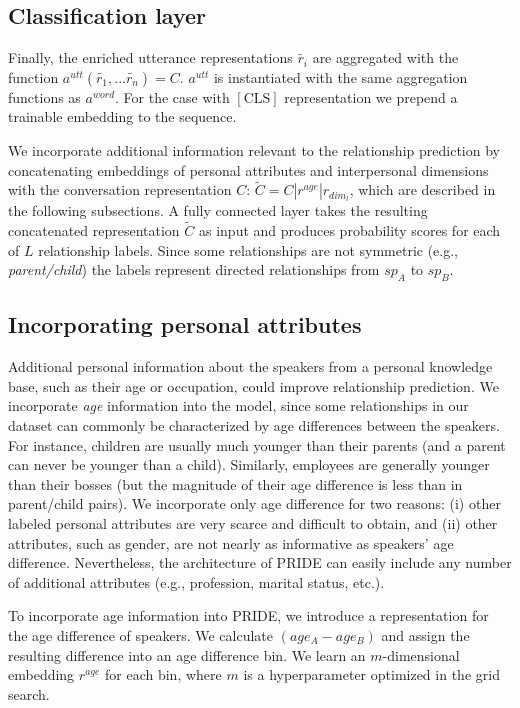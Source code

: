 \subsection{Classification layer}

Finally, the enriched utterance representations $\tilde{r_i}$ are aggregated with the function ${a^{utt}(\tilde{r_1},...\tilde{r_n})=C}$. 
$a^{utt}$ is instantiated with the same aggregation functions as $a^{word}$. For the case with $[\textrm{CLS}]$ representation we prepend a trainable embedding to the sequence.

We incorporate additional information relevant to the relationship prediction by concatenating embeddings of personal attributes and interpersonal dimensions with the conversation representation $C$: $\tilde{C} = C|r^{age}|r_{dim_l}$, which are described in the following subsections.
A fully connected layer takes the resulting concatenated representation $\tilde{C}$ as input and produces probability scores for each of $L$ relationship labels. Since some relationships are not symmetric (e.g., \emph{parent/child}) the labels represent directed relationships from $sp_A$ to $sp_B$.


\subsection{Incorporating personal attributes}

Additional personal information about the speakers from a personal knowledge base, such as their age or occupation, could improve relationship prediction.
We incorporate \textit{age} information into the model, since some relationships in our dataset can commonly be characterized by age differences between the speakers. For instance, children are usually much younger than their parents (and a parent can never be younger than a child). Similarly, employees are generally younger than their bosses (but the magnitude of their age difference is less than in parent/child pairs). We incorporate only age difference for two reasons: (i) other labeled personal attributes are very scarce and difficult to obtain, and (ii) other attributes, such as gender, are not nearly as informative as speakers' age difference. Nevertheless, the architecture of PRIDE can easily include any number of additional attributes (e.g., profession, marital status, etc.).

To incorporate age information into PRIDE, we introduce a representation for the age difference of speakers. We calculate $(age_A - age_B)$ and assign the resulting difference into an age difference bin.
We learn an $m$-dimensional embedding $r^{age}$  for each bin, where $m$ is a hyperparameter optimized in the grid search.

